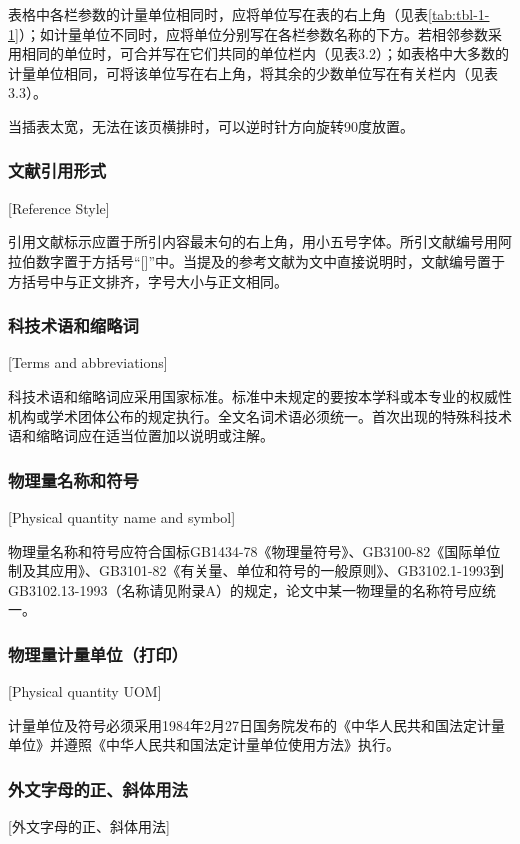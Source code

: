 表格中各栏参数的计量单位相同时，应将单位写在表的右上角（见表\ref{tab:tbl-1-1}）；如计量单位不同时，应将单位分别写在各栏参数名称的下方。若相邻参数采用相同的单位时，可合并写在它们共同的单位栏内（见表3.2）；如表格中大多数的计量单位相同，可将该单位写在右上角，将其余的少数单位写在有关栏内（见表3.3）。

当插表太宽，无法在该页横排时，可以逆时针方向旋转90度放置。

\subsubsection{文献引用形式}[Reference Style]

引用文献标示应置于所引内容最末句的右上角，用小五号字体。所引文献编号用阿拉伯数字置于方括号“[]”中。当提及的参考文献为文中直接说明时，文献编号置于方括号中与正文排齐，字号大小与正文相同。

\subsubsection{科技术语和缩略词}[Terms and abbreviations]

科技术语和缩略词应采用国家标准。标准中未规定的要按本学科或本专业的权威性机构或学术团体公布的规定执行。全文名词术语必须统一。首次出现的特殊科技术语和缩略词应在适当位置加以说明或注解。

\subsubsection{物理量名称和符号}[Physical quantity name and symbol]

物理量名称和符号应符合国标GB1434-78《物理量符号》、GB3100-82《国际单位制及其应用》、GB3101-82《有关量、单位和符号的一般原则》、GB3102.1-1993到GB3102.13-1993（名称请见附录A）的规定，论文中某一物理量的名称符号应统一。

\subsubsection{物理量计量单位（打印）}[Physical quantity UOM]

计量单位及符号必须采用1984年2月27日国务院发布的《中华人民共和国法定计量单位》并遵照《中华人民共和国法定计量单位使用方法》执行。

\subsubsection{外文字母的正、斜体用法}[外文字母的正、斜体用法]

